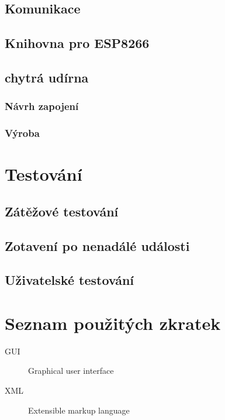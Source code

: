 \documentclass[thesis=B,czech]{FITthesis}[2019/12/23]
\begin{document}
\section{Komunikace}

\section{Knihovna pro ESP8266}

\section{chytrá udírna}

\subsection{Návrh zapojení}

\subsection{Výroba}



\chapter{Testování}

\section{Zátěžové testování}

\section{Zotavení po nenadálé události}

\section{Uživatelské testování}



\begin{conclusion}
\end{conclusion}




\appendix

\chapter{Seznam použitých zkratek}
\begin{description}
    \item[GUI] Graphical user interface
    \item[XML] Extensible markup language
\end{description}
\end{document}
